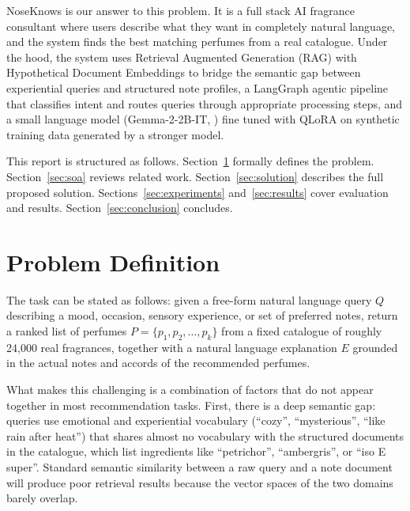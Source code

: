 \documentclass[11pt,a4paper]{article}
\begin{document}
NoseKnows is our answer to this problem. It is a full stack AI fragrance consultant where users describe what they want in completely natural language, and the system finds the best matching perfumes from a real catalogue. Under the hood, the system uses Retrieval Augmented Generation (RAG) \citep{lewis2020rag} with Hypothetical Document Embeddings \citep{gao2022hyde} to bridge the semantic gap between experiential queries and structured note profiles, a LangGraph \citep{langgraph2024} agentic pipeline that classifies intent and routes queries through appropriate processing steps, and a small language model (Gemma-2-2B-IT, \citealt{gemma2024}) fine tuned with QLoRA \citep{dettmers2023qlora} on synthetic training data generated by a stronger model.

This report is structured as follows. Section~\ref{sec:problem} formally defines the problem. Section~\ref{sec:soa} reviews related work. Section~\ref{sec:solution} describes the full proposed solution. Sections~\ref{sec:experiments} and~\ref{sec:results} cover evaluation and results. Section~\ref{sec:conclusion} concludes.

\section{Problem Definition}
\label{sec:problem}

The task can be stated as follows: given a free-form natural language query $Q$ describing a mood, occasion, sensory experience, or set of preferred notes, return a ranked list of perfumes $P = \{p_1, p_2, \ldots, p_k\}$ from a fixed catalogue of roughly 24,000 real fragrances, together with a natural language explanation $E$ grounded in the actual notes and accords of the recommended perfumes.

What makes this challenging is a combination of factors that do not appear together in most recommendation tasks. First, there is a deep semantic gap: queries use emotional and experiential vocabulary (``cozy'', ``mysterious'', ``like rain after heat'') that shares almost no vocabulary with the structured documents in the catalogue, which list ingredients like ``petrichor'', ``ambergris'', or ``iso E super''. Standard semantic similarity between a raw query and a note document will produce poor retrieval results because the vector spaces of the two domains barely overlap.
\end{document}
